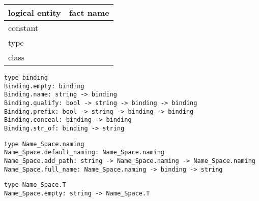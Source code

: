 \begin{isabellebody}
\begin{isamarkuptext}
  \medskip
  \begin{tabular}{ll}
  logical entity & fact name \\\hline
  constant \isa{c} & \isa{c{\isachardot}intro} \\
  type \isa{c} & \isa{c{\isacharunderscore}type{\isachardot}intro} \\
  class \isa{c} & \isa{c{\isacharunderscore}class{\isachardot}intro} \\
  \end{tabular}%
\end{isamarkuptext}%
\isamarkuptrue%
%
\isadelimmlref
%
\endisadelimmlref
%
\isatagmlref
%
\begin{isamarkuptext}%
\begin{mldecls}
  \verb|type binding| \\
  \verb|Binding.empty: binding| \\
  \verb|Binding.name: string -> binding| \\
  \verb|Binding.qualify: bool -> string -> binding -> binding| \\
  \verb|Binding.prefix: bool -> string -> binding -> binding| \\
  \verb|Binding.conceal: binding -> binding| \\
  \verb|Binding.str_of: binding -> string| \\
  \end{mldecls}
  \begin{mldecls}
  \verb|type Name_Space.naming| \\
  \verb|Name_Space.default_naming: Name_Space.naming| \\
  \verb|Name_Space.add_path: string -> Name_Space.naming -> Name_Space.naming| \\
  \verb|Name_Space.full_name: Name_Space.naming -> binding -> string| \\
  \end{mldecls}
  \begin{mldecls}
  \verb|type Name_Space.T| \\
  \verb|Name_Space.empty: string -> Name_Space.T| \\

\end{mldecls}
\end{isamarkuptext}
\end{isabellebody}

